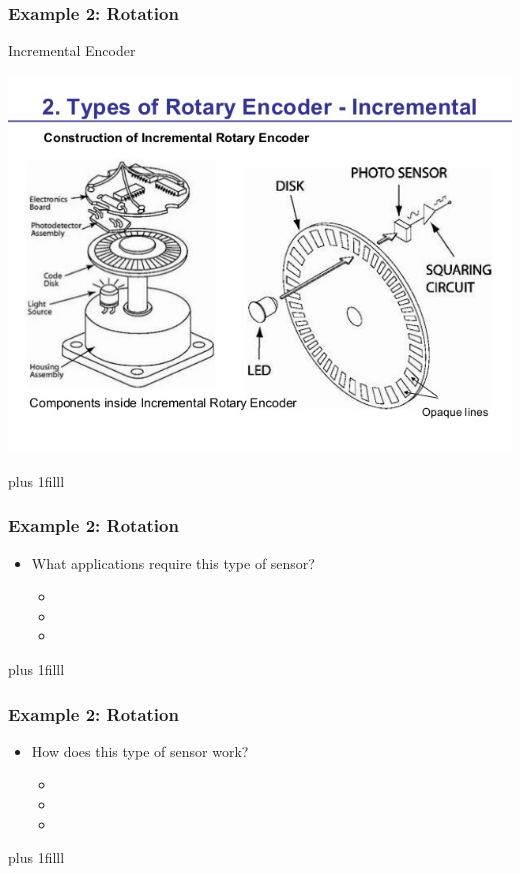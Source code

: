 \documentclass[fleqn]{beamer} %
\newcommand{\sectionIsubsectionIVtitle}{Example 2: Rotation}
\newcommand{\btVFill}{\vskip0pt plus 1filll}
\begin{document}
			\begin{frame}
				\frametitle{\sectionIsubsectionIVtitle}
				
				Incremental Encoder  
	
				\includegraphics[scale=.35]{images/lecture1_fig3.jpg}	
	

				\btVFill

			\end{frame}


			\begin{frame}
				\frametitle{\sectionIsubsectionIVtitle}

				\begin{itemize}
					\item What applications require this type of sensor?
					\begin{itemize}
						\item \vspace{5mm}
						\item \vspace{5mm}
						\item \vspace{5mm}	
					\end{itemize}
				\end{itemize}

				\btVFill

			\end{frame}

			\begin{frame}
				\frametitle{\sectionIsubsectionIVtitle}

				\begin{itemize}
					\item How does this type of sensor work?
					\begin{itemize}
						\item \vspace{5mm}
						\item \vspace{5mm}
						\item \vspace{5mm}	
					\end{itemize}
				\end{itemize}
				
				\btVFill

			\end{frame}
\end{document}
